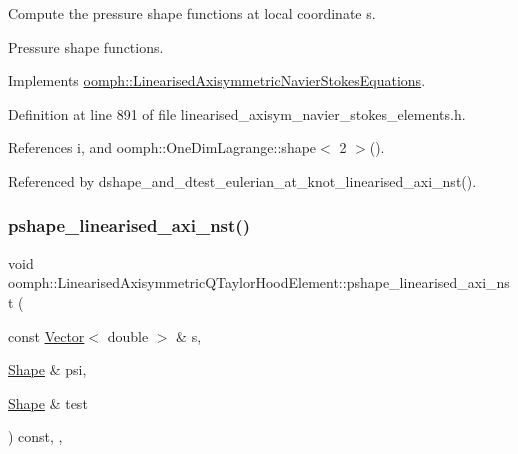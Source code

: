 Compute the pressure shape functions at local coordinate s. 

Pressure shape functions. 

Implements \hyperlink{classoomph_1_1LinearisedAxisymmetricNavierStokesEquations_a86dd84e88a2f10e33f61b1a09c8aefd7}{oomph\+::\+Linearised\+Axisymmetric\+Navier\+Stokes\+Equations}.



Definition at line 891 of file linearised\+\_\+axisym\+\_\+navier\+\_\+stokes\+\_\+elements.\+h.



References i, and oomph\+::\+One\+Dim\+Lagrange\+::shape$<$ 2 $>$().



Referenced by dshape\+\_\+and\+\_\+dtest\+\_\+eulerian\+\_\+at\+\_\+knot\+\_\+linearised\+\_\+axi\+\_\+nst().

\mbox{\label{classoomph_1_1LinearisedAxisymmetricQTaylorHoodElement_ab8e94bf4d8ad2e64e85b6c12bac90a8f}} 
\subsubsection{\texorpdfstring{pshape\+\_\+linearised\+\_\+axi\+\_\+nst()}{pshape\_linearised\_axi\_nst()}\hspace{0.1cm}{\footnotesize\ttfamily [2/2]}}
{\footnotesize\ttfamily void oomph\+::\+Linearised\+Axisymmetric\+Q\+Taylor\+Hood\+Element\+::pshape\+\_\+linearised\+\_\+axi\+\_\+nst (\begin{DoxyParamCaption}\item[{const \hyperlink{classoomph_1_1Vector}{Vector}$<$ double $>$ \&}]{s,  }\item[{\hyperlink{classoomph_1_1Shape}{Shape} \&}]{psi,  }\item[{\hyperlink{classoomph_1_1Shape}{Shape} \&}]{test }\end{DoxyParamCaption}) const\hspace{0.3cm}{\ttfamily [inline]}, {\ttfamily [protected]}, {\ttfamily [virtual]}}



